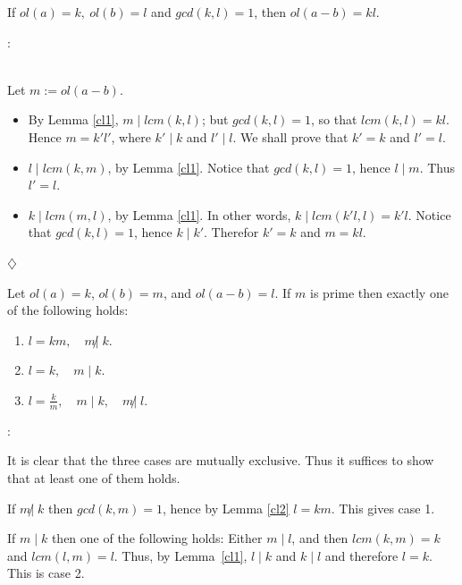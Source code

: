 {\begin{lem} \label{cl2} %
	If $ ol(a)=k, \ ol(b)=l $ and $ gcd(k,l)=1 $, then $ ol(a-b)=kl$. %
\end{lem}
\begin{pr}:{\rm  \\
		Let $ m:=ol(a-b) $.
	\begin{itemize}
		   \item By Lemma \ref{cl1}, $ m \mid lcm(k,l) $; but $gcd(k,l)=1$,
		    so that $ lcm(k,l)=kl $. Hence $ m=k'l'$, where $ k' \mid k $ and 
		    $ l' \mid l $. We shall prove that  $ k'=k$ and $ l'=l $.
	      \item $ l \mid lcm(k,m) $, by Lemma \ref{cl1}. Notice that 
		    $ gcd(k,l)=1 $, hence $ l \mid m $. Thus $l'=l$.
	      \item $ k \mid lcm(m,l) $, by Lemma \ref{cl1}. In other words,
		    $ k \mid lcm(k'l,l)=k'l $. Notice that $ gcd(k,l)=1 $, 
		    hence $ k \mid k' $. Therefor $ k'=k $ and $ m=kl $.
	\end{itemize}
		 }
	\begin{flushright}
		$\diamondsuit$
	\end{flushright}
\end{pr}

	    
\begin{lem}\label{cl4} %
       Let $ ol(a)=k $, $ ol(b)=m $, and $ ol(a-b)=l $. If $m$ is prime      
       then exactly one of the following holds:
       \begin{enumerate}
	    \item $l=km, \quad m \not| \; k$.  
	    \item $ l=k, \quad m \mid k $. 
	    \item $ l=\frac{k}{m}, \quad m \mid k, \quad m \not| \; l $.
       \end{enumerate}                                        
\end{lem}
\begin{pr}: {\rm
It is clear that the three cases are mutually exclusive. Thus it suffices to show that at 
least one of them holds. 
 
 If $ m \not| \; k$ then $gcd(k,m)=1$, hence by Lemma \ref{cl2} $l=km$. This gives case 1. 
      
 If $m \mid k$  then one of the following holds: 
 Either $ m \mid l$, and then $ lcm(k,m)=k$ and $ lcm(l,m)=l$. Thus, by Lemma~\ref{cl1}, 
 $ l \mid k$ and $ k \mid l$ and therefore $l=k$. This is case 2. 

}
\end{pr}}
